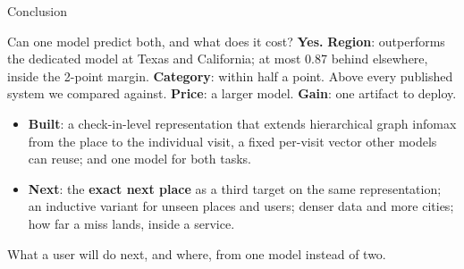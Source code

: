 \documentclass{beamer}
\begin{document}
\begin{frame}{Conclusion}
    \vspace{0pt}%
    \small
    \begin{alertblock}{Can one model predict both, and what does it cost?}
        \small\textbf{Yes.} \textbf{Region}: outperforms the dedicated model at Texas and California;
        at most 0.87 behind elsewhere, inside the 2-point margin. \textbf{Category}: within half a
        point. Above every published system we compared against. \textbf{Price}: a larger model.
        \textbf{Gain}: one artifact to deploy.
    \end{alertblock}
    \begin{itemize}\setlength{\itemsep}{0.6ex}
        \item \textbf{Built}: a check-in-level representation that extends hierarchical graph
              infomax from the place to the individual visit, a fixed per-visit vector other models
              can reuse; and one model for both tasks.
        \item \textbf{Next}: the \textbf{exact next place} as a third target on the same
              representation; an inductive variant for unseen places and users; denser data and more
              cities; how far a miss lands, inside a service.
    \end{itemize}

    \begin{block}{}
        \centering\small
        What a user will do next, and where, from one model instead of two.
    \end{block}
\end{frame}
\end{document}
